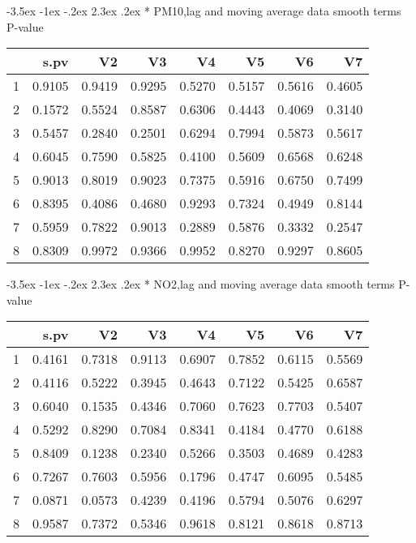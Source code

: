 \documentclass[a4paper, 12pt]{article}
\makeatletter
\def\Large{\fontsize{16}{24}\selectfont}
\renewcommand\section{\@startsection {section}{1}{\z@}%
                                   {-3.5ex \@plus -1ex \@minus -.2ex}%
                                   {2.3ex \@plus.2ex}%
                                   {\centering\normalfont\Large\bfseries}}
\makeatother
\begin{document}
\section*{ PM10,lag and moving average data}
smooth terms P-value
\begin{table}[ht]
\centering
\begin{tabular}{rrrrrrrr}
  \hline
 & s.pv & V2 & V3 & V4 & V5 & V6 & V7 \\
  \hline
1 & 0.9105 & 0.9419 & 0.9295 & 0.5270 & 0.5157 & 0.5616 & 0.4605 \\
  2 & 0.1572 & 0.5524 & 0.8587 & 0.6306 & 0.4443 & 0.4069 & 0.3140 \\
  3 & 0.5457 & 0.2840 & 0.2501 & 0.6294 & 0.7994 & 0.5873 & 0.5617 \\
  4 & 0.6045 & 0.7590 & 0.5825 & 0.4100 & 0.5609 & 0.6568 & 0.6248 \\
  5 & 0.9013 & 0.8019 & 0.9023 & 0.7375 & 0.5916 & 0.6750 & 0.7499 \\
  6 & 0.8395 & 0.4086 & 0.4680 & 0.9293 & 0.7324 & 0.4949 & 0.8144 \\
  7 & 0.5959 & 0.7822 & 0.9013 & 0.2889 & 0.5876 & 0.3332 & 0.2547 \\
  8 & 0.8309 & 0.9972 & 0.9366 & 0.9952 & 0.8270 & 0.9297 & 0.8605 \\
   \hline
\end{tabular}
\end{table}
\clearpage
\section*{ NO2,lag and moving average data}
smooth terms P-value
\begin{table}[ht]
\centering
\begin{tabular}{rrrrrrrr}
  \hline
 & s.pv & V2 & V3 & V4 & V5 & V6 & V7 \\
  \hline
1 & 0.4161 & 0.7318 & 0.9113 & 0.6907 & 0.7852 & 0.6115 & 0.5569 \\
  2 & 0.4116 & 0.5222 & 0.3945 & 0.4643 & 0.7122 & 0.5425 & 0.6587 \\
  3 & 0.6040 & 0.1535 & 0.4346 & 0.7060 & 0.7623 & 0.7703 & 0.5407 \\
  4 & 0.5292 & 0.8290 & 0.7084 & 0.8341 & 0.4184 & 0.4770 & 0.6188 \\
  5 & 0.8409 & 0.1238 & 0.2340 & 0.5266 & 0.3503 & 0.4689 & 0.4283 \\
  6 & 0.7267 & 0.7603 & 0.5956 & 0.1796 & 0.4747 & 0.6095 & 0.5485 \\
  7 & 0.0871 & 0.0573 & 0.4239 & 0.4196 & 0.5794 & 0.5076 & 0.6297 \\
  8 & 0.9587 & 0.7372 & 0.5346 & 0.9618 & 0.8121 & 0.8618 & 0.8713 \\
   \hline
\end{tabular}
\end{table}
\clearpage
\end{document}
